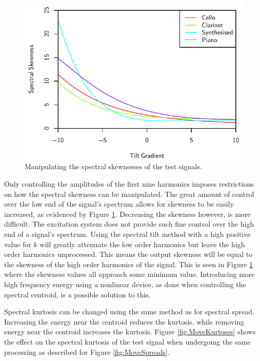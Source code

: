 			\begin{figure}[h!]
				\centering
				\includegraphics{chapter6/Images/MoveSkewnesses.pdf}
				\caption{Manipulating the spectral skewnesses of the test signals.}
				\label{fig:MoveSkewnesses}
			\end{figure}

			Only controlling the amplitudes of the first nine harmonics imposes restrictions on how the
			spectral skewness can be manipulated. The great amount of control over the low end of the signal's
			spectrum allows for skewness to be easily increased, as evidenced by Figure
			\ref{fig:MoveSkewnesses}.  Decreasing the skewness however, is more difficult. The excitation
			system does not provide such fine control over the high end of a signal's spectrum. Using the
			spectral tilt method with a high positive value for $k$ will greatly attenuate the low order
			harmonics but leave the high order harmonics unprocessed. This means the output skewness will be
			equal to the skewness of the high order harmonics of the signal. This is seen in Figure
			\ref{fig:MoveSkewnesses} where the skewness values all approach some minimum value. Introducing
			more high frequency energy using a nonlinear device, as done when controlling the spectral
			centroid, is a possible solution to this.

			Spectral kurtosis can be changed using the same method as for spectral spread. Increasing the
			energy near the centroid reduces the kurtosis, while removing energy near the centroid increases
			the kurtosis. Figure \ref{fig:MoveKurtoses} shows the effect on the spectral kurtosis of the test
			signal when undergoing the same processing as described for Figure \ref{fig:MoveSpreads}.
			
